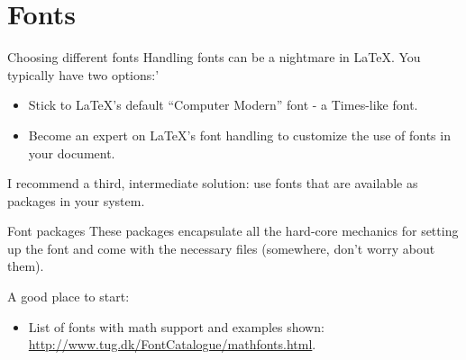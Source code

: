 \documentclass[english]{beamer}
\begin{document}

\section{Fonts}



\begin{frame}{\insertsection}{Choosing different fonts}
  Handling fonts can be a nightmare in \LaTeX. You typically have two
  options:'
  \begin{itemize}
  \item Stick to \LaTeX's default ``Computer Modern'' font - a
    Times-like font.
  \item Become an expert on \LaTeX's font handling to customize the
    use of fonts in your document.
  \end{itemize}
  I recommend a third, intermediate solution: use fonts that are
  available as packages in your system.
\end{frame}

\begin{frame}{\insertsection}{Font packages}
  These packages encapsulate all the hard-core mechanics for setting
  up the font and come with the necessary files (somewhere, don't
  worry about them).

  A good place to start:
  \begin{itemize}
  \item List of fonts with math support and examples shown:
    \href{http://www.tug.dk/FontCatalogue/mathfonts.html}{http://www.tug.dk/FontCatalogue/mathfonts.html}.
  \end{itemize}
\end{frame}

\end{document}
